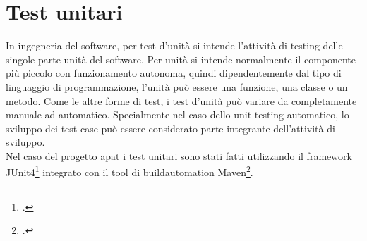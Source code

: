 \section{Test unitari}\label{sec:test-unitari}
In ingegneria del software, per test d'unità si intende l'attività di testing delle singole parte unità del software.
Per unità si intende normalmente il componente più piccolo con funzionamento autonoma, quindi dipendentemente dal tipo di linguaggio di programmazione, l'unità può essere una funzione, una classe o un metodo.
Come le altre forme di test, i test d'unità può variare da completamente manuale ad automatico.
Specialmente nel caso dello unit testing automatico, lo sviluppo dei test case può essere considerato parte integrante dell'attività di sviluppo.\\

Nel caso del progetto \gls{apat} i test unitari sono stati fatti utilizzando il framework JUnit4\footcite{site:junit4} integrato con il tool di \gls{buildautomation} Maven\footcite{site:maven}.
\setcounter{rowcount}{0}

\setcounter{testCounter}{0}

